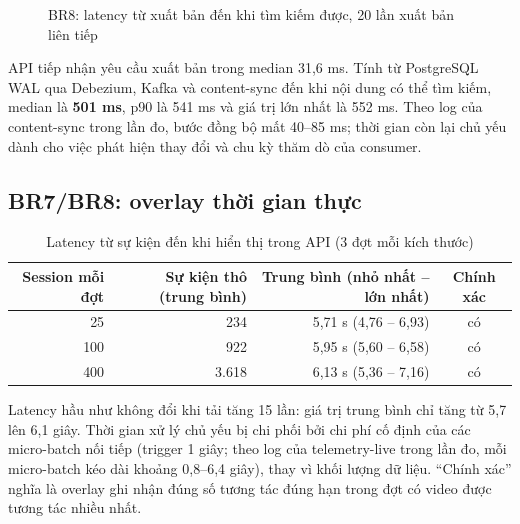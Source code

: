 \begin{figure}[H]
\centering
{}
\caption{BR8: latency từ xuất bản đến khi tìm kiếm được, 20 lần xuất bản liên tiếp}
\label{fig:sync-latency}
\end{figure}

API tiếp nhận yêu cầu xuất bản trong median 31,6 ms. Tính từ PostgreSQL WAL qua Debezium, Kafka và content-sync đến khi nội dung có thể tìm kiếm, median là \textbf{501 ms}, p90 là 541 ms và giá trị lớn nhất là 552 ms. Theo log của content-sync trong lần đo, bước đồng bộ mất 40--85 ms; thời gian còn lại chủ yếu dành cho việc phát hiện thay đổi và chu kỳ thăm dò của consumer.

\subsection{BR7/BR8: overlay thời gian thực}

\begin{table}[H]
\centering\small
\caption{Latency từ sự kiện đến khi hiển thị trong API (3 đợt mỗi kích thước)}\label{tab:live}
\begin{tabular}{@{}rrrc@{}}
\toprule
\textbf{Session mỗi đợt} & \textbf{Sự kiện thô (trung bình)} & \textbf{Trung bình (nhỏ nhất -- lớn nhất)} & \textbf{Chính xác} \\
\midrule
25 & 234 & 5,71 s (4,76 -- 6,93) & có \\
100 & 922 & 5,95 s (5,60 -- 6,58) & có \\
400 & 3.618 & 6,13 s (5,36 -- 7,16) & có \\
\bottomrule
\end{tabular}
\end{table}

Latency hầu như không đổi khi tải tăng 15 lần: giá trị trung bình chỉ tăng từ 5,7 lên 6,1 giây. Thời gian xử lý chủ yếu bị chi phối bởi chi phí cố định của các micro-batch nối tiếp (trigger 1 giây; theo log của telemetry-live trong lần đo, mỗi micro-batch kéo dài khoảng 0,8--6,4 giây), thay vì khối lượng dữ liệu. ``Chính xác'' nghĩa là overlay ghi nhận đúng số tương tác đúng hạn trong đợt có video được tương tác nhiều nhất.

